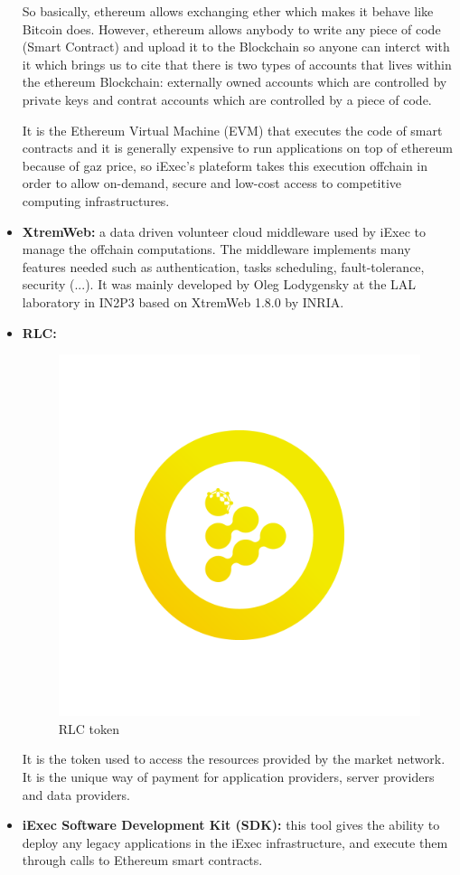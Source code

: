 \begin{itemize}
        So basically, ethereum allows exchanging ether which makes it behave like Bitcoin does. However,
        ethereum allows anybody to write any piece of code (Smart Contract) and upload it to the Blockchain
        so anyone can interct with it which brings us to cite that there is two types of accounts that lives
        within the ethereum Blockchain: externally owned accounts which are controlled by private keys and
        contrat accounts which are controlled by a piece of code.
        
        It is the Ethereum Virtual Machine (EVM) that executes the code of smart contracts and it is
        generally expensive to run applications on top of ethereum because of gaz price, so iExec's
        plateform takes this execution offchain in order to allow on-demand, secure and low-cost access to
        competitive computing infrastructures.

        \item \textbf{XtremWeb\cite{xtremweb}:} a data driven volunteer cloud middleware used by iExec to manage
        the offchain computations. The middleware implements many features needed such as authentication,
        tasks scheduling, fault-tolerance, security (...). \newline
        It was mainly developed by Oleg Lodygensky\cite{oleg-lodygensky} at the LAL laboratory in IN2P3 based on
        XtremWeb 1.8.0 by INRIA.

        \item \textbf{RLC\cite{RLC}:}

        \begin{figure}[!h]\centering
            \includegraphics[width=.3\columnwidth]{3-State-of-the-art/figs/RLC.png}
            \caption{RLC token}
        \end{figure}

        It is the token used to access the resources provided by the market network.
        It is the unique way of payment for application providers, server providers and data providers.

        \item \textbf{iExec Software Development Kit\cite{iexec-sdk} (SDK):} this tool gives the ability to
        deploy any legacy applications in the iExec infrastructure, and execute them through calls to
        Ethereum smart contracts.


\end{itemize}
